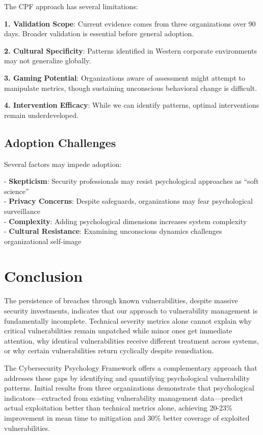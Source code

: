 \documentclass[11pt,a4paper]{article}
\begin{document}
The CPF approach has several limitations:

\textbf{1. Validation Scope}: Current evidence comes from three organizations over 90 days. Broader validation is essential before general adoption.

\textbf{2. Cultural Specificity}: Patterns identified in Western corporate environments may not generalize globally.

\textbf{3. Gaming Potential}: Organizations aware of assessment might attempt to manipulate metrics, though sustaining unconscious behavioral change is difficult.

\textbf{4. Intervention Efficacy}: While we can identify patterns, optimal interventions remain underdeveloped.

\subsection{Adoption Challenges}

Several factors may impede adoption:

- \textbf{Skepticism}: Security professionals may resist psychological approaches as ``soft science''\\
- \textbf{Privacy Concerns}: Despite safeguards, organizations may fear psychological surveillance\\
- \textbf{Complexity}: Adding psychological dimensions increases system complexity\\
- \textbf{Cultural Resistance}: Examining unconscious dynamics challenges organizational self-image\\

\section{Conclusion}

The persistence of breaches through known vulnerabilities, despite massive security investments, indicates that our approach to vulnerability management is fundamentally incomplete. Technical severity metrics alone cannot explain why critical vulnerabilities remain unpatched while minor ones get immediate attention, why identical vulnerabilities receive different treatment across systems, or why certain vulnerabilities return cyclically despite remediation.

The Cybersecurity Psychology Framework offers a complementary approach that addresses these gaps by identifying and quantifying psychological vulnerability patterns. Initial results from three organizations demonstrate that psychological indicators—extracted from existing vulnerability management data—predict actual exploitation better than technical metrics alone, achieving 20-23\% improvement in mean time to mitigation and 30\% better coverage of exploited vulnerabilities.
\end{document}
